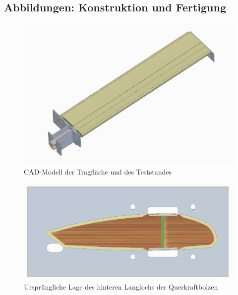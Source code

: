 \subsection{Abbildungen: Konstruktion und Fertigung}
\begin{figure}[h]
	\includegraphics[width=1.0\textwidth]{Bilder/AufbauGesamt.jpg}
	\caption{CAD-Modell der Tragfläche und des Teststandes}
	\label{fig:AufbauGesamt}
\end{figure}

\begin{figure}[h]
	\includegraphics[width=1.0\textwidth]{Bilder/SeiteRichtig.jpg}
	\caption{Ursprüngliche Lage des hinteren Langlochs der Querkraftbolzen}
	\label{fig: SeiteRichtig}
\end{figure}

